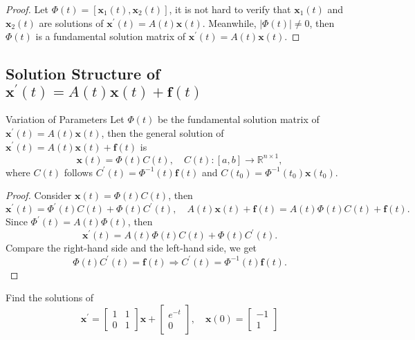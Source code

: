 \begin{proof}
  Let $\Phi(t) = [\mathbf{x}_1(t), \mathbf{x}_2(t)]$,
  it is not hard to verify that $\mathbf{x}_1(t)$ and $\mathbf{x}_2(t)$ are solutions of
  $\mathbf{x}^{\prime}(t) = A(t) \mathbf{x}(t)$.
  Meanwhile, $|\Phi(t)| \neq 0$, then $\Phi(t)$ is a fundamental solution matrix of $\mathbf{x}^{\prime}(t) = A(t)\mathbf{x}(t)$.
\end{proof}

\subsection{Solution Structure of $\mathbf{x}^{\prime}(t) = A(t) \mathbf{x}(t) + \mathbf{f}(t)$}

\begin{proposition}{Variation of Parameters}{}
  Let $\Phi(t)$ be the fundamental solution matrix of $\mathbf{x}^{\prime}(t) = A(t)\mathbf{x}(t)$,
  then the general solution of $\mathbf{x}^{\prime}(t) = A(t) \mathbf{x}(t) + \mathbf{f}(t)$ is
  \begin{equation}
    \mathbf{x}(t) = \Phi(t)C(t), \quad C(t): [a, b] \rightarrow \mathbb{R}^{n \times 1},
  \end{equation}
  where $C(t)$ follows $C^{\prime}(t) = \Phi^{-1}(t)\mathbf{f}(t)$
  and $C(t_0) = \Phi^{-1}(t_0) \mathbf{x}(t_0)$.
\end{proposition}

\begin{proof}
  Consider $\mathbf{x}(t) = \Phi(t)C(t)$, then
  \begin{equation}
    \mathbf{x}^{\prime}(t) = \Phi^{\prime}(t) C(t) + \Phi(t)C^{\prime}(t), \quad
    A(t)\mathbf{x}(t) + \mathbf{f}(t) = A(t) \Phi(t) C(t) + \mathbf{f}(t).
  \end{equation}
  Since $\Phi^{\prime}(t) = A(t)\Phi(t)$, then
  \begin{equation}
    \mathbf{x}^{\prime}(t) = A(t) \Phi(t)C(t) + \Phi(t)C^{\prime}(t).
  \end{equation}
  Compare the right-hand side and the left-hand side, we get
  \begin{equation}
    \Phi(t)C^{\prime}(t) = \mathbf{f}(t) \Rightarrow C^{\prime}(t) = \Phi^{-1}(t) \mathbf{f}(t).
  \end{equation}
\end{proof}

\begin{example}{}{}
  Find the solutions of
  \begin{equation}
    \mathbf{x}^{\prime} =
    \begin{bmatrix}
      1 & 1\\
      0 & 1
    \end{bmatrix} \mathbf{x} +
    \begin{bmatrix}
      e^{-t}\\
      0
    \end{bmatrix}, \quad
    \mathbf{x}(0) =
    \begin{bmatrix}
      -1 \\
      1
    \end{bmatrix}
  \end{equation}
\end{example}

